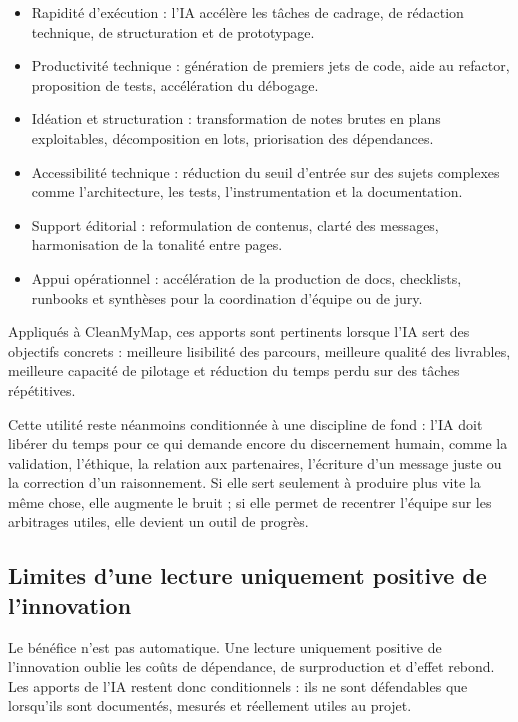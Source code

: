 \documentclass[
  10pt,
  a4paper,
  DIV=11,
  numbers=noendperiod,
  oneside]{scrreprt}
\providecommand{\tightlist}{%
  \setlength{\itemsep}{0pt}\setlength{\parskip}{0pt}}
\begin{document}
\begin{itemize}
\tightlist
\item
  Rapidité d'exécution : l'IA accélère les tâches de cadrage, de
  rédaction technique, de structuration et de prototypage.
\item
  Productivité technique : génération de premiers jets de code, aide au
  refactor, proposition de tests, accélération du débogage.
\item
  Idéation et structuration : transformation de notes brutes en plans
  exploitables, décomposition en lots, priorisation des dépendances.
\item
  Accessibilité technique : réduction du seuil d'entrée sur des sujets
  complexes comme l'architecture, les tests, l'instrumentation et la
  documentation.
\item
  Support éditorial : reformulation de contenus, clarté des messages,
  harmonisation de la tonalité entre pages.
\item
  Appui opérationnel : accélération de la production de docs,
  checklists, runbooks et synthèses pour la coordination d'équipe ou de
  jury.
\end{itemize}

Appliqués à CleanMyMap, ces apports sont pertinents lorsque l'IA sert
des objectifs concrets : meilleure lisibilité des parcours, meilleure
qualité des livrables, meilleure capacité de pilotage et réduction du
temps perdu sur des tâches répétitives.

Cette utilité reste néanmoins conditionnée à une discipline de fond :
l'IA doit libérer du temps pour ce qui demande encore du discernement
humain, comme la validation, l'éthique, la relation aux partenaires,
l'écriture d'un message juste ou la correction d'un raisonnement. Si
elle sert seulement à produire plus vite la même chose, elle augmente le
bruit ; si elle permet de recentrer l'équipe sur les arbitrages utiles,
elle devient un outil de progrès.

\subsection{Limites d'une lecture uniquement positive de
l'innovation}\label{limites-dune-lecture-uniquement-positive-de-linnovation}

Le bénéfice n'est pas automatique. Une lecture uniquement positive de
l'innovation oublie les coûts de dépendance, de surproduction et d'effet
rebond. Les apports de l'IA restent donc conditionnels : ils ne sont
défendables que lorsqu'ils sont documentés, mesurés et réellement utiles
au projet.
\end{document}
